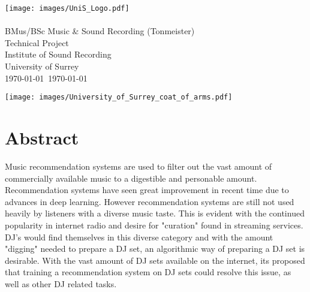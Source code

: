 
\graphicspath{{FrontMatter/}}

\begin{titlepage}
\thispagestyle{empty}
\hfill\texttt{[image: images/UniS\_Logo.pdf]}
{\sf
\centering
\null\vfil\vfil
	{
		\huge\LongTitle\\
	}
\vfil\vfil\vfil
	{
		\Large\Me\\
	}
\vfil\vfil\vfil
	{
		\Large{}BMus/BSc Music \& Sound Recording (Tonmeister)\\
		Technical Project\\
	}
\vfil\vfil
	{
		\Large{}Institute of Sound Recording\\
		University of Surrey\\
	}
\vfil
	{
		\Large\MyMonth\today~\MyYear\today\\}
	}

	{
		\texttt{[image: images/University\_of\_Surrey\_coat\_of\_arms.pdf]}
		\vspace{-.4in}
	}
\end{titlepage}

\setlength{\parskip}{1ex plus 0.2ex minus 0.2ex} %
\onehalfspacing



\chapter*{Abstract}
\thispagestyle{empty}
\setcounter{page}{2}

Music recommendation systems are used to filter out the vast amount of commercially available music to a digestible and personable amount. Recommendation systems have seen great improvement in recent time due to advances in deep learning. However recommendation systems are still not used heavily by listeners with a diverse music taste. This is evident with the continued popularity in internet radio and desire for "curation" found in streaming services. DJ's would find themselves in this diverse category and with the amount "digging" needed to prepare a DJ set, an algorithmic way of preparing a DJ set is desirable. With the vast amount of DJ sets available on the internet, its proposed that training a recommendation system on DJ sets could resolve this issue, as well as other DJ related tasks.

